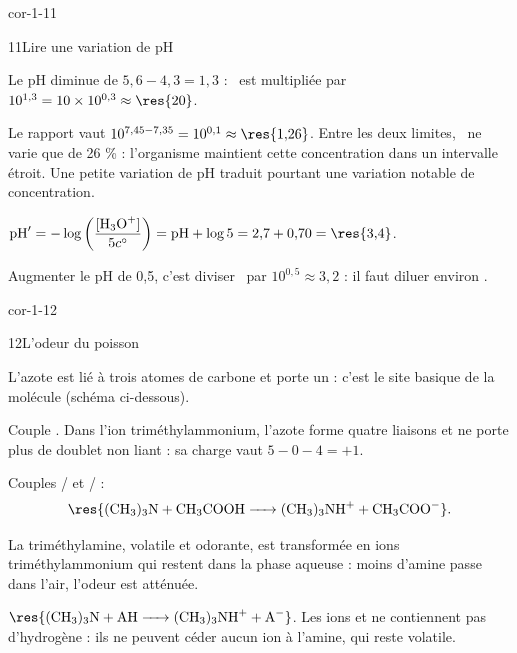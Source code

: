 \begin{blocLivre}{cor-1-11}
\begin{corrige}{11}{Lire une variation de pH}
\begin{questions}
\item Le pH diminue de $5{,}6-4{,}3=1{,}3$ : \hho\ est multipliée par $10^{1{,}3}=10\times10^{0{,}3}\approx\res{20}$.
\item Le rapport vaut $10^{7{,}45-7{,}35}=10^{0{,}1}\approx\res{1{,}26}$. Entre les deux limites, \hho\ ne varie
que de 26 \% : l'organisme maintient cette concentration dans un intervalle étroit. Une petite variation de pH
traduit pourtant une variation notable de concentration.
\item $\pH'=-\log\left(\dfrac{\hho}{5\cst}\right)=\pH+\log5=2{,}7+0{,}70=\res{3{,}4}$.
\item Augmenter le pH de 0,5, c'est diviser \hho\ par $10^{0{,}5}\approx3{,}2$ : il faut diluer environ
.
\end{questions}
\end{corrige}
\end{blocLivre}
\begin{blocLivre}{cor-1-12}
\begin{corrige}{12}{L'odeur du poisson}
\begin{questions}
\item L'azote est lié à trois atomes de carbone et porte un  : c'est le site
basique de la molécule (schéma ci-dessous).
\item Couple . Dans l'ion triméthylammonium, l'azote forme quatre liaisons
et ne porte plus de doublet non liant : sa charge vaut $5-0-4=+1$.
\item Couples / et / :
\[\res{\ce{(CH3)3N + CH3COOH -> (CH3)3NH+ + CH3COO-}}.\]
\item La triméthylamine, volatile et odorante, est transformée en ions triméthylammonium qui restent
dans la phase aqueuse : moins d'amine passe dans l'air, l'odeur est atténuée.
\item $\res{\ce{(CH3)3N + AH -> (CH3)3NH+ + A-}}$. Les ions  et  ne contiennent pas
d'hydrogène : ils ne peuvent céder aucun ion  à l'amine, qui reste volatile.
\end{questions}
\begin{center}
\hspace{14mm}
\par
{}
\end{center}
\end{corrige}
\end{blocLivre}
